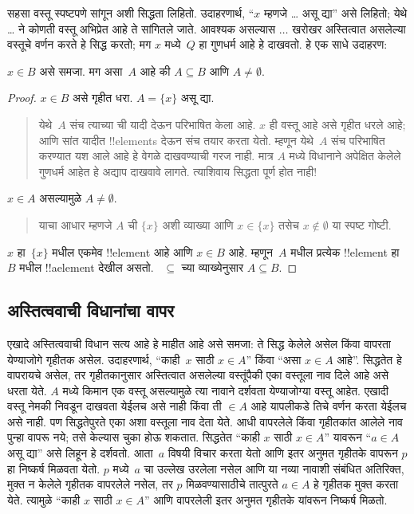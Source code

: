 \documentclass[../../../include/open-logic-section]{subfiles}
\begin{document}
सहसा वस्तू स्पष्टपणे सांगून अशी सिद्धता लिहितो. उदाहरणार्थ, “$x$ म्हणजे \dots{} असू द्या” असे लिहितो; येथे \dots{} ने कोणती वस्तू अभिप्रेत आहे ते सांगितले जाते. आवश्यक असल्यास $\dots$ खरोखर अस्तित्वात असलेल्या वस्तूचे वर्णन करते हे सिद्ध करतो; मग $x$ मध्ये~$Q$ हा गुणधर्म आहे हे दाखवतो. हे एक साधे उदाहरण:

\begin{prop}
$x \in B$ असे समजा. मग असा~$A$ आहे की $A \subseteq B$ आणि $A \neq \emptyset$.
\end{prop}

\begin{proof}
$x \in B$ असे गृहीत धरा. $A = \{x\}$ असू द्या.
\begin{quote}
येथे~$A$ संच त्याच्या ची यादी देऊन परिभाषित केला आहे. $x$ ही वस्तू आहे असे गृहीत धरले आहे; आणि सांत यादीत !!{element}s देऊन संच तयार करता येतो. म्हणून येथे~$A$ संच परिभाषित करण्यात यश आले आहे हे वेगळे दाखवण्याची गरज नाही. मात्र $A$ मध्ये विधानाने अपेक्षित केलेले गुणधर्म आहेत हे अद्याप दाखवावे लागते. त्याशिवाय सिद्धता पूर्ण होत नाही!{}
\end{quote}
$x \in A$ असल्यामुळे $A \neq \emptyset$.
\begin{quote}
याचा आधार म्हणजे $A$ ची $\{x\}$ अशी व्याख्या आणि $x \in \{x\}$ तसेच $x \notin \emptyset$ या स्पष्ट गोष्टी.
\end{quote}
$x$ हा~$\{x\}$ मधील एकमेव !!{element} आहे आणि $x \in B$ आहे. म्हणून~$A$ मधील प्रत्येक !!{element} हा~$B$ मधील !!a{element} देखील असतो. ~$ \subseteq$ च्या व्याख्येनुसार $A \subseteq B$.
\end{proof}

\subsection{अस्तित्ववाची विधानांचा वापर}

एखादे अस्तित्ववाची विधान सत्य आहे हे माहीत आहे असे समजा: ते सिद्ध केलेले असेल किंवा वापरता येण्याजोगे गृहीतक असेल. उदाहरणार्थ, “काही~$x$ साठी $x \in A$” किंवा “असा $x \in A$ आहे”. सिद्धतेत हे वापरायचे असेल, तर गृहीतकानुसार अस्तित्वात असलेल्या वस्तूंपैकी एका वस्तूला नाव दिले आहे असे धरता येते. $A$ मध्ये किमान एक वस्तू असल्यामुळे त्या नावाने दर्शवता येण्याजोग्या वस्तू आहेत. एखादी वस्तू नेमकी निवडून दाखवता येईलच असे नाही किंवा ती $\in A$ आहे यापलीकडे तिचे वर्णन करता येईलच असे नाही. पण सिद्धतेपुरते एका अशा वस्तूला नाव देता येते. आधी वापरलेले किंवा गृहीतकांत आलेले नाव पुन्हा वापरू नये; तसे केल्यास चुका होऊ शकतात. सिद्धतेत “काही $x$ साठी $x \in A$” यावरून “$a \in A$ असू द्या” असे लिहून हे दर्शवतो. आता~$a$ विषयी विचार करता येतो आणि इतर अनुमत गृहीतके वापरून $p$ हा निष्कर्ष मिळवता येतो. $p$ मध्ये~$a$ चा उल्लेख उरलेला नसेल आणि या नव्या नावाशी संबंधित अतिरिक्त, मुक्त न केलेले गृहीतक वापरलेले नसेल, तर $p$ मिळवण्यासाठीचे तात्पुरते $a \in A$ हे गृहीतक मुक्त करता येते. त्यामुळे “काही $x$ साठी $x \in A$” आणि वापरलेली इतर अनुमत गृहीतके यांवरून निष्कर्ष मिळतो.
\end{document}
